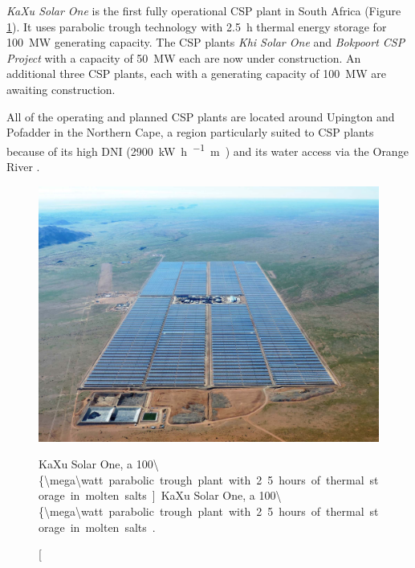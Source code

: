 
\emph{KaXu Solar One} is the first fully operational CSP plant in South Africa (Figure \ref{KaXu-solar-field}). It uses parabolic trough technology with \SI{2.5}{\hour} thermal energy storage for \SI{100}{\mega\watt} generating capacity. The CSP plants \emph{Khi Solar One} and \emph{Bokpoort CSP Project} with a capacity of \SI{50}{\mega\watt} each are now under construction. An additional three CSP plants, each with a generating capacity of \SI{100}{\mega\watt} are awaiting construction. 

All of the operating and planned CSP plants are located around Upington and Pofadder in the Northern Cape, a region particularly suited to CSP plants because of its high DNI (\SI{2900}{\kilo\watt\hour\per\squared\meter\year}) and its water access via the Orange River \cite{Forder2015}.

\begin{figure}[!h]
\centering
\includegraphics[width=1\linewidth]{FIG/KaXu-solar-field}
\caption[KaXu Solar One, a \SI{100\{\mega\watt} parabolic trough plant with 2.5 hours of thermal storage in molten salts.]{KaXu Solar One, a \SI{100\{\mega\watt} parabolic trough plant with 2.5 hours of thermal storage in molten salts \cite{AbengoaSolar2015}.}\label{KaXu-solar-field}
\end{figure}
\pagebreak 
